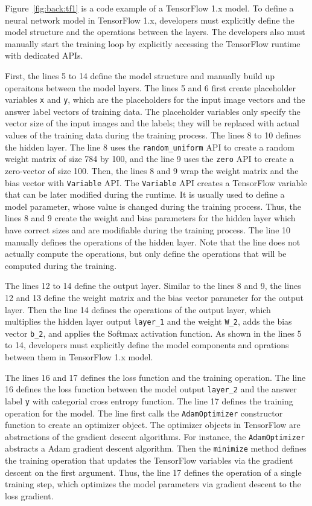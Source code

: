 Figure~\ref{fig:back:tf1} is a code example of a TensorFlow 1.x model.
To define a neural network model in TensorFlow 1.x, 
developers must explicitly define the model structure
and the operations between the layers. 
The developers also must manually start the training loop by explicitly
accessing the TensorFlow runtime with dedicated APIs.

First, the lines 5 to 14 define the model structure and manually build up
operaitons between the model layers.
The lines 5 and 6 first create placeholder variables {\tt x} and {\tt y},
which are the placeholders for the input image vectors 
and the answer label vectors of training data.
The placeholder variables only specify the vector size of the input images
and the labels; they will be replaced with actual values of the training
data during the training process. 
The lines 8 to 10 defines the hidden layer.
The line 8 uses the {\tt random\_uniform} API to create 
a random weight matrix of size 784 by 100, 
and the line 9 uses the {\tt zero} API to create a zero-vector of size 100.
Then, the lines 8 and 9 wrap the weight matrix and the bias vector with
{\tt Variable} API.
The {\tt Variable} API creates a TensorFlow variable that can be later modified
during the runtime. It is usually used to define a model 
parameter, whose value is changed during the training process.
Thus, the lines 8 and 9 create the weight and bias parameters for the
hidden layer which have correct sizes and are modifiable during the 
training process.
The line 10 manually defines the operations of the hidden layer. 
Note that the line does not actually compute the operations,
but only define the operations that will be computed during the training.

The lines 12 to 14 define the output layer.
Similar to the lines 8 and 9, the lines 12 and 13 define the weight matrix
and the bias vector parameter for the output layer.
Then the line 14 defines the operations of the output layer,
which multiplies the hidden layer output {\tt layer\_1} and
the weight {\tt W\_2}, adds the bias vector {\tt b\_2}, and applies the
Softmax activation function.
As shown in the lines 5 to 14, developers must explicitly define
the model components and oprations between them in TensorFlow 1.x model.

The lines 16 and 17 defines the loss function and the training operation. 
The line 16 defines the loss function between the model output {\tt layer\_2} 
and the answer label {\tt y} with categorial cross entropy function.
The line 17 defines the training operation for the model.
The line first calls the {\tt AdamOptimizer} constructor
function to create an optimizer object.
The optimizer objects in TensorFlow are abstractions of the gradient
descent algorithms.
For instance, the {\tt AdamOptimizer} abstracts a Adam gradient descent
algorithm. %
Then the {\tt minimize} method defines the training operation that updates the
TensorFlow variables via the gradient descent on the first argument.
Thus, the line 17 defines the operation of a single training step,
which optimizes the model parameters via gradient descent to the loss gradient.

